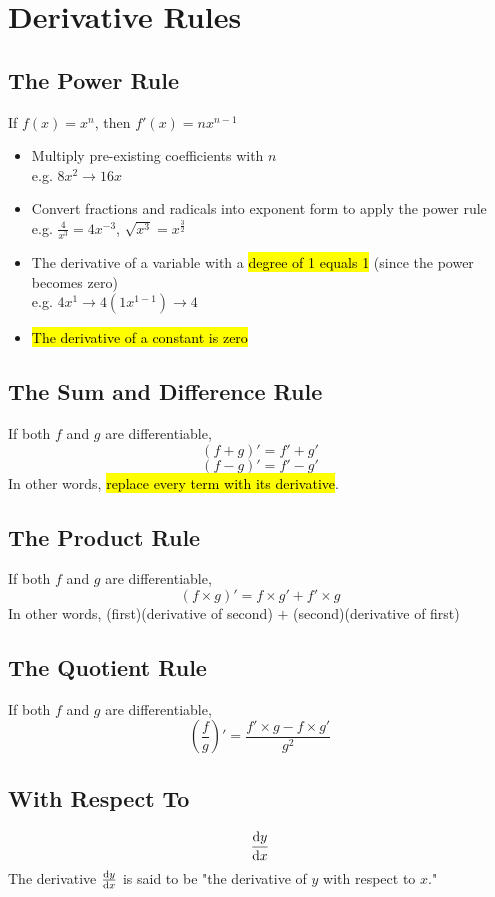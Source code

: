 \documentclass[a4paper,12pt]{article}
\begin{document}
\section{Derivative Rules}

\subsection{The Power Rule}
\begin{center}
If $f(x) = x^n$, then $f'(x) = nx^{n-1}$
\end{center}
\begin{itemize}
    \item{Multiply pre-existing coefficients with $n$ \\ e.g. $8x^2 \longrightarrow 16x$}
    \item{Convert fractions and radicals into exponent form to apply the power rule \\ e.g. $\frac{4}{x^3} = 4x^{-3}$, $\sqrt{x^3} = x^{\frac{3}{2}}$}
    \item{The derivative of a variable with a \hl{degree of 1 equals 1} (since the power becomes zero) \\ e.g. $4x^1 \longrightarrow 4(1x^{1-1}) \longrightarrow 4$}
    \item{\hl{The derivative of a constant is zero}}
\end{itemize}

\subsection{The Sum and Difference Rule}
If both $f$ and $g$ are differentiable,
$$(f+g)' = f' + g'$$
$$(f-g)' = f' - g'$$
In other words, \hl{replace every term with its derivative}.

\subsection{The Product Rule}
If both $f$ and $g$ are differentiable,
$$(f \times g)' = f \times g' + f' \times g$$
In other words, (first)(derivative of second) $+$ (second)(derivative of first)

\subsection{The Quotient Rule}
If both $f$ and $g$ are differentiable,
$$\left( \frac{f}{g} \right)' = \frac{f' \times g - f \times g'}{g^2}$$

\subsection{With Respect To}
$$\dv{y}{x}$$
The derivative $\dv{y}{x}$ is said to be "the derivative of $y$ with respect to $x$."
\end{document}
